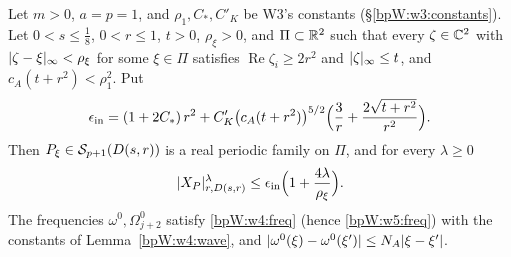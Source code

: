 
\begin{proposition}\label{bpW:w5:initial}
Let $m>0$, $a=p=1$, and $\rho_1,C_*,C'_K$ be W3's constants (\S\ref{bpW:w3:constants}). Let $0<s\le\frac18$, $0<r\le1$,
$t>0$, $\rho_\xi>0$, and $\Pi\subset\mathbb{R}^2$ such that every $\zeta\in\mathbb{C}^2$ with $\lvert \zeta-\xi\rvert_\infty<\rho_\xi$ for some
$\xi\in\Pi$ satisfies $\operatorname{Re}\zeta_i\ge2r^2$ and $\lvert \zeta\rvert_\infty\le t$, and $c_A(t+r^2)<\rho_1^2$. Put
\[\epsilon_{\rm in}=(1+2C_*)\,r^2+C'_K\bigl(c_A(t+r^2)\bigr)^{5/2}\Bigl(\frac3r+\frac{2\sqrt{t+r^2}}{r^2}\Bigr).\]
Then $P_\xi\in\mathcal S_{p+1}(D(s,r))$ is a real periodic family on $\Pi$, and for every $\lambda\ge0$
\[\lvert X_P\rvert^\lambda_{r,D(s,r)}\le\epsilon_{\rm in}\Bigl(1+\frac{4\lambda}{\rho_\xi}\Bigr).\]
The frequencies $\omega^0,\Omega^0_{j+2}$ satisfy \eqref{bpW:w4:freq} (hence \eqref{bpW:w5:freq}) with the constants of
Lemma~\ref{bpW:w4:wave}, and $\lvert \omega^0(\xi)-\omega^0(\xi')\rvert\le N_A\lvert \xi-\xi'\rvert$.
\end{proposition}

